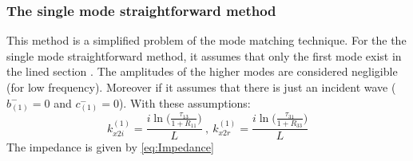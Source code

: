 \subsubsection{The single mode straightforward method}
This method is a simplified problem of the mode matching technique.
For the the single mode straightforward method, it assumes that only the first mode exist in the lined section \cite{Zhou_thesis}. The amplitudes of the higher modes are considered negligible (for low frequency). Moreover if it assumes that there is just an incident wave ($b_{(1)}^-=0$ and $c_{(1)}^-=0$). With these assumptions:
\begin{equation}
    k_{x2i}^{(1)}=\frac{i\ln\Big(\frac{\tau_{13}}{1+R_{11}}\Big)}{L}\ , \ k_{x2r}^{(1)}=\frac{i\ln\Big(\frac{\tau_{31}}{1+R_{33}}\Big)}{L}
\end{equation}
The impedance is given by \ref{eq:Impedance}
\clearpage
